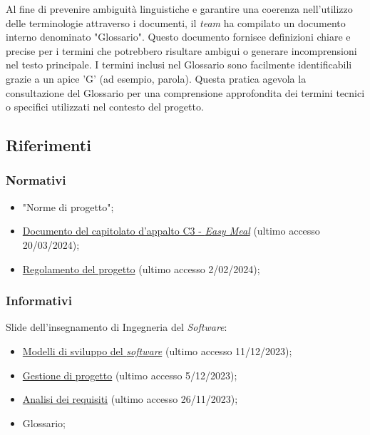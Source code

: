 Al fine di prevenire ambiguità linguistiche e garantire una coerenza nell'utilizzo
delle terminologie attraverso i documenti, il \textit{team} ha compilato un documento
interno denominato "Glossario".
Questo documento fornisce definizioni chiare e precise per i termini che potrebbero
risultare ambigui o generare incomprensioni nel testo principale.
I termini inclusi nel Glossario sono facilmente identificabili grazie a un apice 'G'
(ad esempio, parola\g).
Questa pratica agevola la consultazione del Glossario per una comprensione approfondita
dei termini tecnici o specifici utilizzati nel contesto del progetto.

\subsection{Riferimenti}

\subsubsection{Normativi}
\begin{itemize}
	\item "Norme di progetto";
	\item 	\href{https://www.math.unipd.it/~tullio/IS-1/2023/Progetto/C3.pdf}  
	      {Documento del capitolato d'appalto C3 - \textit{Easy Meal}} (ultimo accesso 20/03/2024);
	\item \href{https://www.math.unipd.it/~tullio/IS-1/2023/Dispense/PD2.pdf}
	      {Regolamento del progetto} (ultimo accesso 2/02/2024);
\end{itemize}

\subsubsection{Informativi}

Slide dell'insegnamento di Ingegneria del \textit{Software}:
\begin{itemize}
	\item \href{https://www.math.unipd.it/~tullio/IS-1/2023/Dispense/T3.pdf}
	      {Modelli di sviluppo del \textit{software}} (ultimo accesso 11/12/2023);
	\item \href{https://www.math.unipd.it/~tullio/IS-1/2023/Dispense/T4.pdf}
	      {Gestione di progetto} (ultimo accesso 5/12/2023);
	\item \href{https://www.math.unipd.it/~tullio/IS-1/2023/Dispense/T5.pdf}
	      {Analisi dei requisiti} (ultimo accesso 26/11/2023);
	\item Glossario;
\end{itemize}

